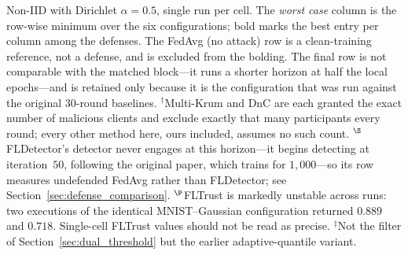 \documentclass[journal]{IEEEtran}
\begin{document}
\begin{table}[!t]
\vspace{2pt}
{\footnotesize \raggedright Non-IID with Dirichlet $\alpha=0.5$, single run per cell. The \emph{worst case} column is the row-wise minimum over the six configurations; bold marks the best entry per column among the defenses. The FedAvg (no attack) row is a clean-training reference, not a defense, and is excluded from the bolding. The final row is not comparable with the matched block---it runs a shorter horizon at half the local epochs---and is retained only because it is the configuration that was run against the original $30$-round baselines. $^\dagger$Multi-Krum and DnC are each granted the exact number of malicious clients and exclude exactly that many participants every round; every other method here, ours included, assumes no such count. $^{\S}$FLDetector's detector never engages at this horizon---it begins detecting at iteration~$50$, following the original paper, which trains for $1{,}000$---so its row measures undefended FedAvg rather than FLDetector; see Section~\ref{sec:defense_comparison}. $^{\P}$FLTrust is markedly unstable across runs: two executions of the identical MNIST--Gaussian configuration returned $0.889$ and $0.718$. Single-cell FLTrust values should not be read as precise. $^\ddagger$Not the filter of Section~\ref{sec:dual_threshold} but the earlier adaptive-quantile variant.\par}
\end{table}
\end{document}
